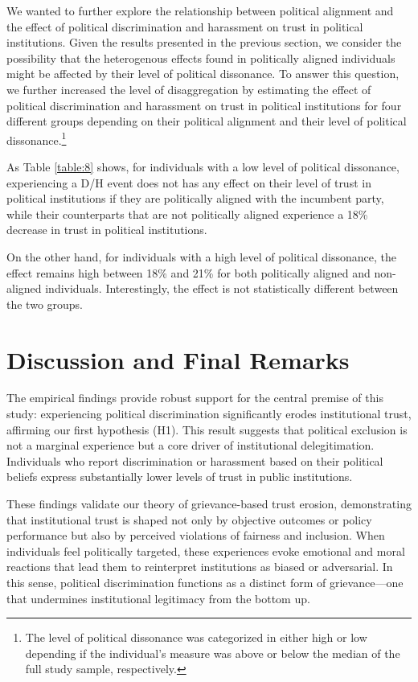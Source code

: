 \documentclass{article}
\begin{document}
We wanted to further explore the relationship between political alignment and the effect of political discrimination and harassment on trust in political institutions. Given the results presented in the previous section, we consider the possibility that the heterogenous effects found in politically aligned individuals might be affected by their level of political dissonance. To answer this question, we further increased the level of disaggregation by estimating the effect of political discrimination and harassment on trust in political institutions for four different groups depending on their political alignment and their level of political dissonance.\footnote{The level of political dissonance was categorized in either high or low depending if the individual's measure was above or below the median of the full study sample, respectively.}

As Table \ref{table:8} shows, for individuals with a low level of political dissonance, experiencing a D/H event does not has any effect on their level of trust in political institutions if they are politically aligned with the incumbent party, while their counterparts that are not politically aligned experience a 18\% decrease in trust in political institutions.

On the other hand, for individuals with a high level of political dissonance, the effect remains high between 18\% and 21\% for both politically aligned and non-aligned individuals. Interestingly, the effect is not statistically different between the two groups.

\section{Discussion and Final Remarks}

The empirical findings provide robust support for the central premise of this study: experiencing political discrimination significantly erodes institutional trust, affirming our first hypothesis (H1). This result suggests that political exclusion is not a marginal experience but a core driver of institutional delegitimation. Individuals who report discrimination or harassment based on their political beliefs express substantially lower levels of trust in public institutions.

These findings validate our theory of grievance-based trust erosion, demonstrating that institutional trust is shaped not only by objective outcomes or policy performance but also by perceived violations of fairness and inclusion. When individuals feel politically targeted, these experiences evoke emotional and moral reactions that lead them to reinterpret institutions as biased or adversarial. In this sense, political discrimination functions as a distinct form of grievance—one that undermines institutional legitimacy from the bottom up.
\end{document}
